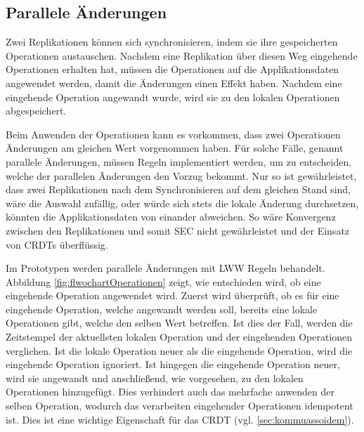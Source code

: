 \documentclass[a4paper, 12pt]{scrreprt}
\begin{document}
\begin{minipage}{\linewidth}
	
\end{minipage}

\subsection{Parallele Änderungen}

Zwei Replikationen können sich synchronisieren, indem sie ihre gespeicherten Operationen austauschen. Nachdem eine Replikation über diesen Weg eingehende Operationen erhalten hat, müssen die Operationen auf die Applikationsdaten angewendet werden, damit die Änderungen einen Effekt haben. Nachdem eine eingehende Operation angewandt wurde, wird sie zu den lokalen Operationen abgespeichert.

Beim Anwenden der Operationen kann es vorkommen, dass zwei Operationen Änderungen am gleichen Wert vorgenommen haben. Für solche Fälle, genannt parallele Änderungen, müssen Regeln implementiert werden, um zu entscheiden, welche der parallelen Änderungen den Vorzug bekommt. Nur so ist gewährleistet, dass zwei Replikationen nach dem Synchronisieren auf dem gleichen Stand sind, wäre die Auswahl zufällig, oder würde sich stets die lokale Änderung durchsetzen, könnten die Applikationsdaten von einander abweichen. So wäre Konvergenz zwischen den Replikationen und somit \ac{SEC} nicht gewährleistet und der Einsatz von CRDTs überflüssig.

Im Prototypen werden parallele Änderungen mit \ac{LWW} Regeln behandelt. Abbildung \ref{fig:flwochartOperationen} zeigt, wie entschieden wird, ob eine eingehende Operation angewendet wird. Zuerst wird überprüft, ob es für eine eingehende Operation, welche angewandt werden soll, bereits eine lokale Operationen gibt, welche den selben Wert betreffen. Ist dies der Fall, werden die Zeitstempel der aktuellsten lokalen Operation und der eingehenden Operationen verglichen. Ist die lokale Operation neuer als die eingehende Operation, wird die eingehende Operation ignoriert. Ist hingegen die eingehende Operation neuer, wird sie angewandt und anschließend, wie vorgesehen, zu den lokalen Operationen hinzugefügt. Dies verhindert auch das mehrfache anwenden der selben Operation, wodurch das verarbeiten eingehender Operationen idempotent ist. Dies ist eine wichtige Eigenschaft für das CRDT (vgl. \ref{sec:kommuassoidem}). 
\end{document}
